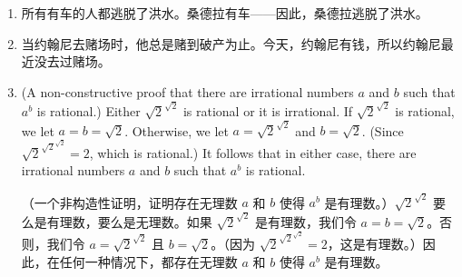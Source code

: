 \begin{enumerate}
\begin{enumerate}
    
    \wbvfill
    
    \item \rule{0pt}{24pt} 
    
    所有有车的人都逃脱了洪水。桑德拉有车——因此，桑德拉逃脱了洪水。
    
    
    \wbvfill
    
    \item \rule{0pt}{24pt}  
    当约翰尼去赌场时，他总是赌到破产为止。今天，约翰尼有钱，所以约翰尼最近没去过赌场。
    \wbvfill
    
    \item \rule{0pt}{24pt} (A non-constructive proof that there are 
    irrational numbers $a$ and $b$ such that $a^b$ is rational.)  
    Either $\sqrt{2}^{\sqrt{2}}$ is rational or it is irrational.
    If $\sqrt{2}^{\sqrt{2}}$ is rational, we let $a=b=\sqrt{2}$.
    Otherwise, we let $a=\sqrt{2}^{\sqrt{2}}$ and $b=\sqrt{2}$.
    (Since $\sqrt{2}^{\sqrt{2}^{\sqrt{2}}} = 2$, which is rational.) It follows that in either case, there
    are irrational numbers $a$ and $b$ such that $a^b$ is rational.
    
    （一个非构造性证明，证明存在无理数 $a$ 和 $b$ 使得 $a^b$ 是有理数。）$\sqrt{2}^{\sqrt{2}}$ 要么是有理数，要么是无理数。如果 $\sqrt{2}^{\sqrt{2}}$ 是有理数，我们令 $a=b=\sqrt{2}$。否则，我们令 $a=\sqrt{2}^{\sqrt{2}}$ 且 $b=\sqrt{2}$。（因为 $\sqrt{2}^{\sqrt{2}^{\sqrt{2}}} = 2$，这是有理数。）因此，在任何一种情况下，都存在无理数 $a$ 和 $b$ 使得 $a^b$ 是有理数。
    \wbvfill
    
    \end{enumerate}
    
    
    
    \end{enumerate}